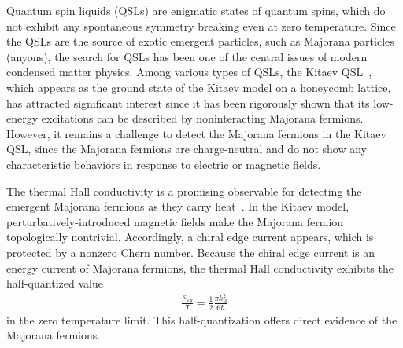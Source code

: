 \documentclass[twocolumn,superscriptaddress,showpacs, longbibliography, aps, prb]{revtex4-2}
\newcommand{\blue}[1]{\textcolor{blue}{#1}}
\newcommand{\orange}[1]{\textcolor{orange}{#1}}
\begin{document}
Quantum spin liquids (QSLs) are enigmatic states of quantum spins,
which do not %
exhibit any 
spontaneous
symmetry breaking even at zero temperature.
Since the QSLs are the source of exotic emergent particles,
such as Majorana particles (anyons), the search for QSLs has been 
one of the central issues of modern condensed matter physics.
Among %
various types of QSLs, the Kitaev QSL~\cite{Kitaev2006}, which appears as the ground state
of the Kitaev model on a %
honeycomb lattice, 
has attracted %
significant interest 
since it has been rigorously 
shown that its low-energy excitations can be described by
noninteracting Majorana fermions.
However, it %
remains a challenge to detect the Majorana fermions
in the Kitaev QSL, since the Majorana fermions are charge-neutral and do not show any characteristic behaviors 
in response to electric or magnetic fields.

The thermal Hall conductivity is a promising observable for detecting the
emergent Majorana fermions as they carry heat~\cite{Kitaev2006}.
In the Kitaev model, perturbatively-introduced magnetic fields make the Majorana fermion %
topologically nontrivial.
Accordingly, a
chiral edge current appears, which is protected by %
a nonzero Chern number.
Because the chiral edge current is an energy current of Majorana fermions, 
the thermal Hall conductivity %
exhibits the half-quantized value 
\begin{align}
{\frac{\kappa_{xy}}{T} = \frac{1}{2} \frac{\pi k_{\mathrm{B}}^2}{6\hbar}}
\end{align}
in the zero temperature limit.
This half-quantization offers
direct evidence of the 
Majorana fermions.

\end{document}
